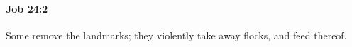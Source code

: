
		\paragraph{Job 24:2} %
			\label{JOB-24-2}

			Some remove the landmarks; they violently take away flocks, and feed thereof.


